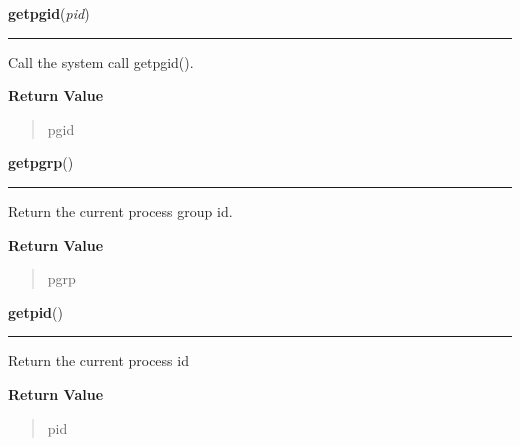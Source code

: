 \hspace{.8\funcindent}\begin{boxedminipage}{\funcwidth}

    \raggedright \textbf{getpgid}(\textit{pid})

    \vspace{-1.5ex}

    \rule{\textwidth}{0.5\fboxrule}
\setlength{\parskip}{2ex}
    Call the system call getpgid().

\setlength{\parskip}{1ex}
      \textbf{Return Value}
    \vspace{-1ex}

      \begin{quote}
      pgid

      \end{quote}

    \end{boxedminipage}

    \label{os:getpgrp}

    \vspace{0.5ex}

\hspace{.8\funcindent}\begin{boxedminipage}{\funcwidth}

    \raggedright \textbf{getpgrp}()

    \vspace{-1.5ex}

    \rule{\textwidth}{0.5\fboxrule}
\setlength{\parskip}{2ex}
    Return the current process group id.

\setlength{\parskip}{1ex}
      \textbf{Return Value}
    \vspace{-1ex}

      \begin{quote}
      pgrp

      \end{quote}

    \end{boxedminipage}

    \label{os:getpid}

    \vspace{0.5ex}

\hspace{.8\funcindent}\begin{boxedminipage}{\funcwidth}

    \raggedright \textbf{getpid}()

    \vspace{-1.5ex}

    \rule{\textwidth}{0.5\fboxrule}
\setlength{\parskip}{2ex}
    Return the current process id

\setlength{\parskip}{1ex}
      \textbf{Return Value}
    \vspace{-1ex}

      \begin{quote}
      pid

      \end{quote}

    \end{boxedminipage}

